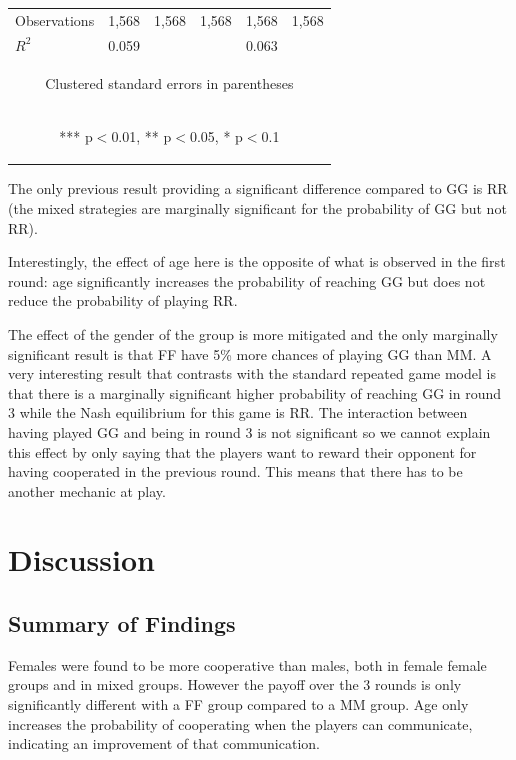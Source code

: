\documentclass{article} %
\begin{document}
\begin{table}[H]
\begin{center}
\begin{tabular}{lccccc}
Observations & 1,568 & 1,568 & 1,568 & 1,568 & 1,568 \\
 $R^2$ & 0.059 &  &  & 0.063 &  \\ \hline
 
\multicolumn{6}{c}{\begin{footnotesize} Clustered standard errors in parentheses\end{footnotesize}} \\
\multicolumn{6}{c}{\begin{footnotesize} *** p$<$0.01, ** p$<$0.05, * p$<$0.1\end{footnotesize}} \\
\end{tabular}
\end{center}





\end{table}

The only previous result providing a significant difference compared to GG is RR (the mixed strategies are marginally significant for the probability of GG but not RR).

Interestingly, the effect of age here is the opposite of what is observed in the first round: age significantly increases the probability of reaching GG but does not reduce the probability of playing RR. 

The effect of the gender of the group is more mitigated and the only marginally significant result is that FF have 5\% more chances of playing GG than MM.
A very interesting result that contrasts with the standard repeated game model is that there is a marginally significant higher probability of reaching GG in round 3 while the Nash equilibrium for this game is RR. The interaction between having played GG and being in round 3 is not significant so we cannot explain this effect by only saying that the players want to reward their opponent for having cooperated in the previous round. This means that there has to be another mechanic at play.

\section{Discussion}
\subsection{Summary of Findings}
Females were found to be more cooperative than males, both in female female groups and in mixed groups. However the payoff over the 3 rounds is only significantly different with a FF group compared to a MM group. Age only increases the probability of cooperating when the players can communicate, indicating an improvement of that communication.
\end{document}
